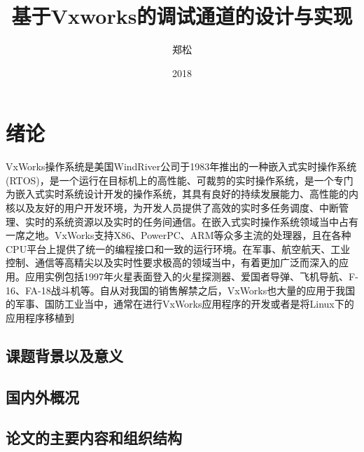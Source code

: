 \documentclass[format=draft,language=chinese,degree=master]{hustthesis}
\title{基于Vxworks的调试通道的设计与实现}{A design and implementation of debug channel based on Vxworks.}
\author{郑松}{Joe}
\date{2018}{3}{26}
\begin{document}
\frontmatter

\maketitle

\makeabstract

\tableofcontents


\mainmatter
\clearpage

\chapter{绪论}\label{chapter:1}

VxWorks操作系统是美国WindRiver公司于1983年推出的一种嵌入式实时操作系统(RTOS)，是一个运行在目标机上的高性能、可裁剪的实时操作系统，是一个专门为嵌入式实时系统设计开发的操作系统，其具有良好的持续发展能力、高性能的内核以及友好的用户开发环境，为开发人员提供了高效的实时多任务调度、中断管理、实时的系统资源以及实时的任务间通信。在嵌入式实时操作系统领域当中占有一席之地。VxWorks支持X86、PowerPC、ARM等众多主流的处理器，且在各种CPU平台上提供了统一的编程接口和一致的运行环境。在军事、航空航天、工业控制、通信等高精尖以及实时性要求极高的领域当中，有着更加广泛而深入的应用。应用实例包括1997年火星表面登入的火星探测器、爱国者导弹、飞机导航、F-16、FA-18战斗机等。自从对我国的销售解禁之后，VxWorks也大量的应用于我国的军事、国防工业当中，通常在进行VxWorks应用程序的开发或者是将Linux下的应用程序移植到

\section{课题背景以及意义}\label{sec:1}
\section{国内外概况}\label{sec:2}

\section{论文的主要内容和组织结构}\label{sec:3}
\end{document}
